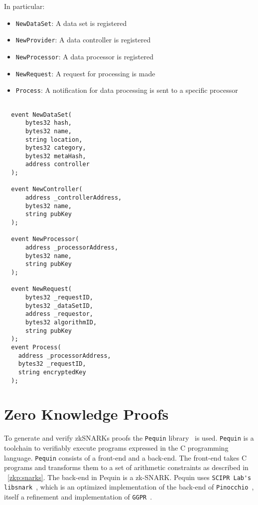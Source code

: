 In particular:

\begin{itemize}
  \item \verb|NewDataSet|: A data set is registered
  \item \verb|NewProvider|: A data controller is registered
  \item \verb|NewProcessor|: A data processor is registered
  \item \verb|NewRequest|: A request for processing is made
  \item \verb|Process|: A notification for data processing is sent to a specific processor
\end{itemize}

\begin{lstlisting}[language=Solidity, caption={Data sharing application events}]

  event NewDataSet(
      bytes32 hash,
      bytes32 name,
      string location,
      bytes32 category,
      bytes32 metaHash,
      address controller
  );

  event NewController(
      address _controllerAddress,
      bytes32 name,
      string pubKey
  );

  event NewProcessor(
      address _processorAddress,
      bytes32 name,
      string pubKey
  );

  event NewRequest(
      bytes32 _requestID,
      bytes32 _dataSetID,
      address _requestor,
      bytes32 algorithmID,
      string pubKey
  );
  event Process(
    address _processorAddress,
    bytes32 _requestID,
    string encryptedKey
  );
\end{lstlisting}

\section{Zero Knowledge Proofs}
\label{implemenation:zkp}

To generate and verify zkSNARKs proofs the \verb|Pequin| library~\cite{pequin} is used. \verb|Pequin| is a toolchain to verifiably execute programs expressed in the C programming language. \verb|Pequin| consists of a front-end and a back-end. The front-end takes C programs and transforms them to a set of arithmetic constraints as described in ~\ref{zkp:snarks}. The back-end in Pequin is a zk-SNARK. Pequin uses \verb|SCIPR Lab's libsnark|~\cite{libsnark}, which is an optimized implementation of the back-end of \verb|Pinocchio|~\cite{pinocchio-nearly-practical-verifiable-computation}, itself a refinement and implementation of \verb|GGPR|~\cite{ggpr}.

